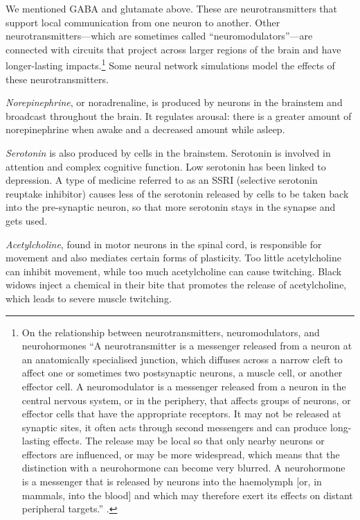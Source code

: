 We mentioned GABA and glutamate above. These are neurotransmitters that support local communication from one neuron to another. Other neurotransmitters---which are sometimes called ``neuromodulators''---are connected with circuits that project across larger regions of the brain and have longer-lasting impacts.\footnote{On the relationship between neurotransmitters, neuromodulators, and neurohormones  ``A neurotransmitter is a messenger released from a neuron at an anatomically specialised junction, which diffuses across a narrow cleft to affect one or sometimes two postsynaptic neurons, a muscle cell, or another effector cell. A neuromodulator is a messenger released from a neuron in the central nervous system, or in the periphery, that affects groups of neurons, or effector cells that have the appropriate receptors. It may not be released at synaptic sites, it often acts through second messengers and can produce long-lasting effects. The release may be local so that only nearby neurons or effectors are influenced, or may be more widespread, which means that the distinction with a neurohormone can become very blurred. A neurohormone is a messenger that is released by neurons into the haemolymph [or, in mammals, into the blood] and which may therefore exert its effects on distant peripheral targets.'' \cite{burrows1996neurobiology}.}   Some neural network simulations model the effects of these neurotransmitters.

\emph{Norepinephrine}, or noradrenaline, is produced by neurons in the brainstem and broadcast throughout the brain. It regulates arousal: there is a greater amount of norepinephrine when awake and a decreased amount while asleep. 

\emph{Serotonin} is also produced by cells in the brainstem. Serotonin is involved in attention and complex cognitive function. Low serotonin has been linked to depression. A type of medicine referred to as an SSRI (selective serotonin reuptake inhibitor) causes less of the serotonin released by cells to be taken back into the pre-synaptic neuron, so that more serotonin stays in the synapse and gets used. 

\emph{Acetylcholine}, found in motor neurons in the spinal cord, is responsible for movement and also mediates certain forms of plasticity. Too little acetylcholine can inhibit movement, while too much acetylcholine can cause twitching. Black widows inject a chemical in their bite that promotes the release of acetylcholine, which leads to severe muscle twitching.

